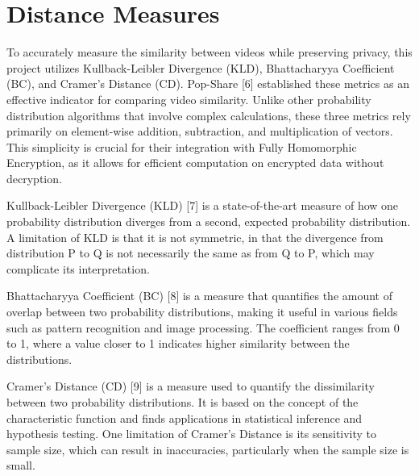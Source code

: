 \section{Distance Measures}

To accurately measure the similarity between videos while preserving privacy, this project utilizes Kullback-Leibler Divergence (KLD), Bhattacharyya Coefficient (BC), and Cramer’s Distance (CD). Pop-Share [6] established these metrics as an effective indicator for comparing video similarity. Unlike other probability distribution algorithms that involve complex calculations, these three metrics rely primarily on element-wise addition, subtraction, and multiplication of vectors. This simplicity is crucial for their integration with Fully Homomorphic Encryption, as it allows for efficient computation on encrypted data without decryption.

Kullback-Leibler Divergence (KLD) [7] is a state-of-the-art measure of how one probability distribution diverges from a second, expected probability distribution. A limitation of KLD is that it is not symmetric, in that the divergence from distribution P to Q is not necessarily the same as from Q to P, which may complicate its interpretation.



Bhattacharyya Coefficient (BC) [8] is a measure that quantifies the amount of overlap between two probability distributions, making it useful in various fields such as pattern recognition and image processing. The coefficient ranges from 0 to 1, where a value closer to 1 indicates higher similarity between the distributions.



Cramer’s Distance (CD) [9] is a measure used to quantify the dissimilarity between two probability distributions. It is based on the concept of the characteristic function and finds applications in statistical inference and hypothesis testing. One limitation of Cramer’s Distance is its sensitivity to sample size, which can result in inaccuracies, particularly when the sample size is small.

